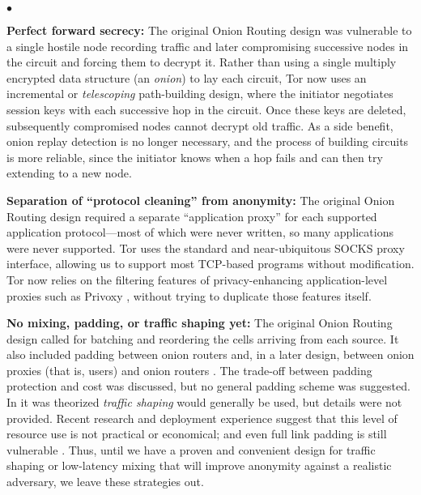 \documentclass[times,10pt,twocolumn]{article}
\newenvironment{tightlist}{\begin{list}{$\bullet$}{
  \setlength{\itemsep}{0mm}
    \setlength{\parsep}{0mm}
    }}{\end{list}}
\begin{document}
\begin{tightlist}

\item \textbf{Perfect forward secrecy:} The original Onion Routing
design was vulnerable to a single hostile node recording traffic and
later compromising successive nodes in the circuit and forcing them
to decrypt it. Rather than using a single multiply encrypted data
structure (an \emph{onion}) to lay each circuit,
Tor now uses an incremental or \emph{telescoping} path-building design,
where the initiator negotiates session keys with each successive hop in
the circuit.  Once these keys are deleted, subsequently compromised nodes
cannot decrypt old traffic.  As a side benefit, onion replay detection
is no longer necessary, and the process of building circuits is more
reliable, since the initiator knows when a hop fails and can then try
extending to a new node.

\item \textbf{Separation of ``protocol cleaning'' from anonymity:}
The original Onion Routing design required a separate ``application
proxy'' for each supported application protocol---most of which were
never written, so many applications were never supported.  Tor uses the
standard and near-ubiquitous SOCKS \cite{socks4} proxy interface, allowing
us to support most TCP-based programs without modification.  Tor now
relies on the filtering features of privacy-enhancing
application-level proxies such as Privoxy \cite{privoxy}, without trying
to duplicate those features itself.

\item \textbf{No mixing, padding, or traffic shaping yet:} The original
Onion
Routing design called for batching and reordering the cells arriving from
each source. It also included padding between onion routers and, in a
later design, between onion proxies (that is, users) and onion routers
\cite{or-ih96,or-jsac98}.  The trade-off between padding protection
and cost was discussed, but no general padding scheme was suggested. In
\cite{or-pet00} it was theorized \emph{traffic shaping} would generally
be used, but details were not provided.  Recent research \cite{econymics}
and deployment experience \cite{freedom21-security} suggest that this
level of resource use is not practical or economical; and even full link
padding is still vulnerable \cite{defensive-dropping}. Thus, until we
have a proven and convenient design for traffic shaping or low-latency
mixing that will improve anonymity against a realistic adversary, we
leave these strategies out.


\end{tightlist}
\end{document}
